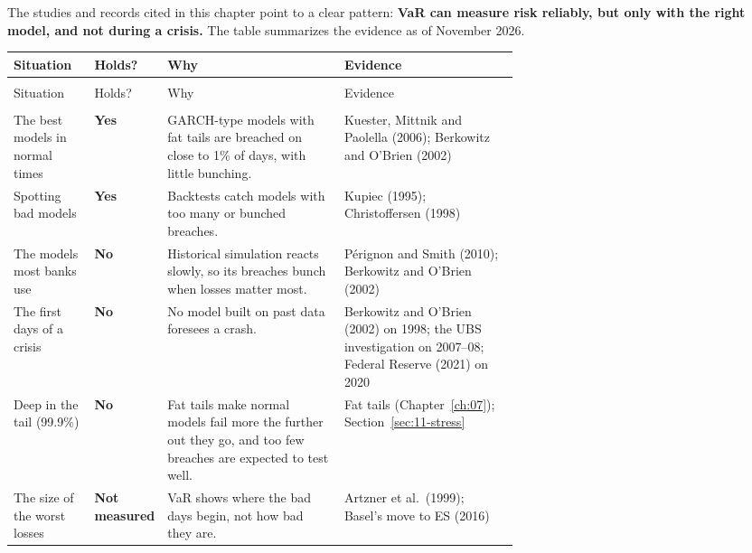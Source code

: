 The studies and records cited in this chapter point to a clear pattern: \textbf{VaR can measure risk reliably, but only with the right model, and not during a crisis.} The table summarizes the evidence as of November 2026.

\begingroup
\small
\setlength{\LTpre}{6pt}\setlength{\LTpost}{6pt}
\begin{longtable}{@{}>{\raggedright\arraybackslash}p{0.16\linewidth}>{\raggedright\arraybackslash}p{0.14\linewidth}>{\raggedright\arraybackslash}p{0.35\linewidth}>{\raggedright\arraybackslash}p{}@{}}
\toprule
Situation & Holds? & Why & Evidence \\
\midrule
\endfirsthead
\multicolumn{4}{@{}l}{\emph{(continued)}} \\
\toprule
Situation & Holds? & Why & Evidence \\
\midrule
\endhead
\midrule
\multicolumn{4}{r@{}}{\emph{(continued on the next page)}} \\
\endfoot
\bottomrule
\endlastfoot
The best models in normal times & \textbf{Yes} & GARCH-type models with fat tails are breached on close to 1\% of days, with little bunching. & Kuester, Mittnik and Paolella (2006); Berkowitz and O'Brien (2002) \\*
Spotting bad models & \textbf{Yes} & Backtests catch models with too many or bunched breaches. & Kupiec (1995); Christoffersen (1998) \\
The models most banks use & \textbf{No} & Historical simulation reacts slowly, so its breaches bunch when losses matter most. & P\'erignon and Smith (2010); Berkowitz and O'Brien (2002) \\
The first days of a crisis & \textbf{No} & No model built on past data foresees a crash. & Berkowitz and O'Brien (2002) on 1998; the UBS investigation on 2007--08; Federal Reserve (2021) on 2020 \\
Deep in the tail (99.9\%) & \textbf{No} & Fat tails make normal models fail more the further out they go, and too few breaches are expected to test well. & Fat tails (Chapter~\ref{ch:07}); Section~\ref{sec:11-stress} \\*
The size of the worst losses & \textbf{Not measured} & VaR\index{Value at Risk (VaR)!backtesting} shows where the bad days begin, not how bad they are. & Artzner et al.\ (1999); Basel's move to ES (2016) \\
\end{longtable}
\addtocounter{table}{-1}%
\endgroup

